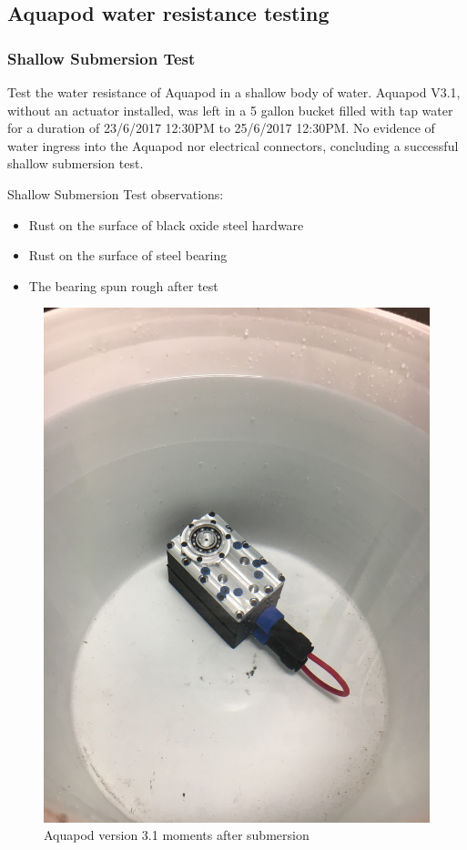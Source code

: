 
\subsection{Aquapod water resistance testing}


\subsubsection{Shallow Submersion Test}
Test the water resistance of Aquapod in a shallow body of water.
Aquapod V3.1, without an actuator installed, was left in a 5 gallon bucket filled with tap water for a duration of 23/6/2017 12:30PM to 25/6/2017 12:30PM. 
No evidence of water ingress into the Aquapod nor electrical connectors, concluding a successful shallow submersion test.

Shallow Submersion Test observations:
\begin{itemize}
    \item Rust on the surface of black oxide steel hardware
    
    \item Rust on the surface of steel bearing

    \item The bearing spun rough after test

\end{itemize}

\begin{figure}[h]
\centering
\includegraphics[width=1.0\columnwidth]{./img/aquaPod-test-one-start.JPG}
\caption{Aquapod version 3.1 moments after submersion}
\label{fig:pod in bucket}
\end{figure}



